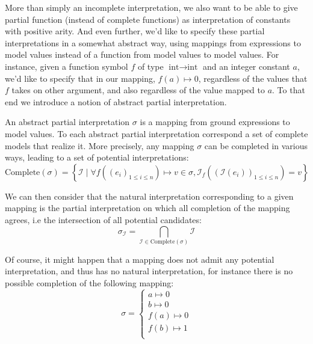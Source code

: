 More than simply an incomplete interpretation, we also want to be able to give partial function (instead of complete functions) as interpretation of
constants with positive arity. And even further, we'd like to specify these partial interpretations in a somewhat
abstract way, using mappings from expressions to model values instead of a function from model values to model
values. For instance, given a function symbol $f$ of type $\text{int} \rightarrow \text{int}$ and an integer constant $a$, we'd like to specify that in our mapping,
$f(a) \mapsto 0$, regardless of the values that $f$ takes on other argument, and also regardless
of the value mapped to $a$. To that end we introduce a notion of abstract partial interpretation.

An abstract partial interpretation $\sigma$ is a mapping from ground expressions to model values. To each abstract partial
interpretation correspond a set of complete models that realize it. More precisely, any mapping $\sigma$ can be completed
in various ways, leading to a set of potential interpretations:
\[
  \text{Complete}(\sigma) =
    \left\{
      \mathcal{I}
      \; | \;
      \forall f( {(e_i)}_{1 \leq i \leq n} ) \mapsto v \in \sigma ,
        \mathcal{I}_f ( {( \mathcal{I}(e_i) )}_{1 \leq i \leq n} ) = v
    \right\}
\]

We can then consider that the natural interpretation corresponding to a given mapping is the
partial interpretation on which all completion of the mapping agrees, i.e the intersection of
all potential candidates:
\[
  \sigma_\mathcal{I} = \bigcap_{ \mathcal{I} \in \text{Complete}(\sigma) } \mathcal{I}
\]

Of course, it might happen that a mapping does not admit any potential interpretation,
and thus has no natural interpretation, for instance there is no possible completion of the
following mapping:
\[
  \sigma = \left\{
    \begin{matrix}
      a \mapsto 0 \\
      b \mapsto 0 \\
      f(a) \mapsto 0 \\
      f(b) \mapsto 1 \\
    \end{matrix}
  \right.
\]


